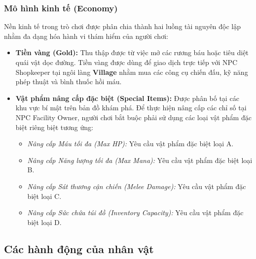 \documentclass[../DoAn.tex]{subfiles}
\begin{document}
\subsubsection{Mô hình kinh tế (Economy)}
Nền kinh tế trong trò chơi được phân chia thành hai luồng tài nguyên độc lập nhằm đa dạng hóa hành vi thám hiểm của người chơi:
\begin{itemize}
    \item \textbf{Tiền vàng (Gold):} Thu thập được từ việc mở các rương báu hoặc tiêu diệt quái vật dọc đường. Tiền vàng được dùng để giao dịch trực tiếp với NPC Shopkeeper tại ngôi làng \textbf{Village} nhằm mua các công cụ chiến đấu, kỹ năng phép thuật và bình thuốc hồi máu.
    \item \textbf{Vật phẩm nâng cấp đặc biệt (Special Items):} Được phân bố tại các khu vực bí mật trên bản đồ khám phá. Để thực hiện nâng cấp các chỉ số tại NPC Facility Owner, người chơi bắt buộc phải sử dụng các loại vật phẩm đặc biệt riêng biệt tương ứng:
    \begin{itemize}
        \item \textit{Nâng cấp Máu tối đa (Max HP):} Yêu cầu vật phẩm đặc biệt loại A.
        \item \textit{Nâng cấp Năng lượng tối đa (Max Mana):} Yêu cầu vật phẩm đặc biệt loại B.
        \item \textit{Nâng cấp Sát thương cận chiến (Melee Damage):} Yêu cầu vật phẩm đặc biệt loại C.
        \item \textit{Nâng cấp Sức chứa túi đồ (Inventory Capacity):} Yêu cầu vật phẩm đặc biệt loại D.
    \end{itemize}
\end{itemize}

\subsection{Các hành động của nhân vật}
\label{subsection:3.3.3}
\end{document}
